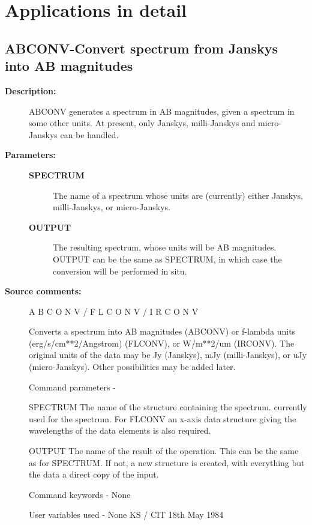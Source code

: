 \section{\label{applic}Applications in detail}
\subsection{ABCONV-\label{ABCONV}Convert spectrum from Janskys into AB magnitudes}
\begin{description}

\item [\textbf{Description:}]
 ABCONV generates a spectrum in AB magnitudes, given a spectrum in
 some other units.  At present, only Janskys, milli-Janskys and
 micro-Janskys can be handled.

\item [\textbf{Parameters:}]
\begin{description}
\item [\textbf{SPECTRUM}]
 The name of a spectrum whose units are (currently)
 either Janskys, milli-Janskys, or micro-Janskys.
\item [\textbf{OUTPUT}]
 The resulting spectrum, whose units will be AB magnitudes.
 OUTPUT can be the same as SPECTRUM, in which case the
 conversion will be performed in situ.
\end{description}

\item [\textbf{Source comments:}]
\begin{terminalv}
 A B C O N V  /  F L C O N V  /  I R C O N V

 Converts a spectrum into AB magnitudes (ABCONV) or f-lambda
 units (erg/s/cm**2/Angstrom) (FLCONV), or W/m**2/um (IRCONV).
 The original units of the data may be Jy (Janskys), mJy
 (milli-Janskys), or uJy (micro-Janskys). Other possibilities
 may be added later.

 Command parameters -

 SPECTRUM The name of the structure containing the spectrum.
          currently used for the spectrum.  For FLCONV
          an x-axis data structure giving the wavelengths of the
          data elements is also required.

 OUTPUT   The name of the result of the operation.  This can
          be the same as for SPECTRUM. If not, a new structure
          is created, with everything but the data a direct
          copy of the input.

 Command keywords  - None

 User variables used - None
                                  KS / CIT 18th May 1984
\end{terminalv}
\end{description}
